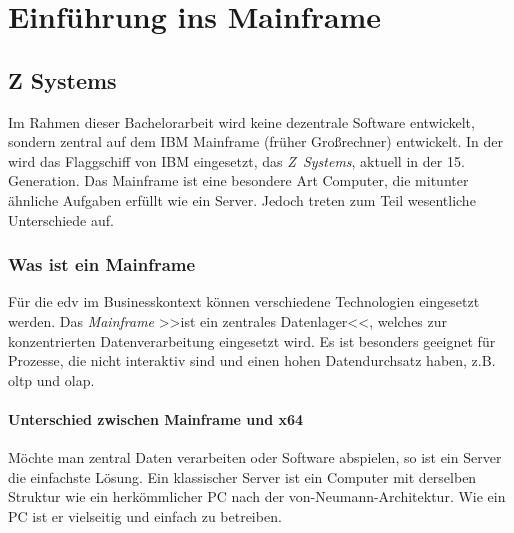\chapter{Einführung ins Mainframe}

\section{Z Systems}
Im Rahmen dieser Bachelorarbeit wird keine dezentrale Software entwickelt, sondern zentral auf dem IBM Mainframe (früher Großrechner) entwickelt.  In der \FirmenName wird das Flaggschiff von IBM eingesetzt, das \emph{Z~Systems}, aktuell in der 15. Generation. Das Mainframe ist eine besondere Art Computer, die mitunter ähnliche Aufgaben erfüllt wie ein Server. Jedoch treten zum Teil wesentliche Unterschiede auf.

\subsection{Was ist ein Mainframe}

Für die \ac{edv} im Businesskontext können verschiedene Technologien eingesetzt werden. Das \emph{Mainframe} >>ist ein zentrales Datenlager<<\cite{redbook.1}, welches zur konzentrierten Datenverarbeitung eingesetzt wird. Es ist besonders geeignet für Prozesse, die nicht interaktiv sind und einen hohen Datendurchsatz haben, z.B. \ac{oltp} und \ac{olap}.


\subsubsection[Z Systems vs. x64]{Unterschied zwischen Mainframe und x64}

Möchte man zentral Daten verarbeiten oder Software abspielen, so ist ein Server die einfachste Lösung. Ein klassischer Server ist ein Computer mit derselben Struktur wie ein herkömmlicher PC nach der \mbox{von-Neumann-Architektur}. Wie ein PC ist er vielseitig und einfach zu betreiben.

